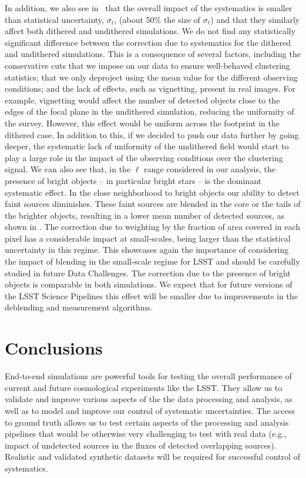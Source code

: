 \documentclass[\docopts]{\docclass}
\begin{document}
In addition, we also see in~ that the overall impact of the systematics is smaller than statistical uncertainty, $\sigma_{\ell}$, (about 50\% the size of $\sigma_{\ell}$) and that they similarly affect both dithered and undithered simulations. We do not find any statistically significant difference between the correction due to systematics for the dithered and undithered simulations. This is a consequence of several factors, including the conservative cuts that we impose on our data to ensure well-behaved clustering statistics; that we only deproject using the mean value for the different observing conditions; and the lack of effects, such as vignetting, present in real images. For example, vignetting would affect the number of detected objects close to the edges of the focal plane in the undithered simulation, reducing the uniformity of the survey. However, this effect would be uniform across the footprint in the dithered case. In addition to this, if we decided to push our data further by going deeper, the systematic lack of uniformity of the undithered field would start to play a large role in the impact of the observing conditions over the clustering signal. We can also see that, in the $\ell$ range considered in our analysis, the presence of bright objects -- in particular bright stars -- is the dominant systematic effect. In the close neighborhood to bright objects our ability to detect faint sources diminishes. These faint sources are blended in the core or the tails of the brighter objects, resulting in a lower mean number of detected sources, as shown in . The correction due to weighting by the fraction of area covered in each pixel has a considerable impact at small-scales, being larger than the statistical uncertainty in this regime. This showcases again the importance of considering the impact of blending in the small-scale regime for LSST and should be carefully studied in future Data Challenges. The correction due to the presence of bright objects is comparable in both simulations. We expect that for future versions of the LSST Science Pipelines this effect will be smaller due to improvements in the deblending and measurement algorithms.


\section{Conclusions}
\label{sec:conclusions}

End-to-end simulations are powerful tools for testing the overall performance of current and future cosmological experiments like the LSST. They allow us to validate and improve various aspects of the the data processing and analysis, as well as to model and improve our control of systematic uncertainties. The access to ground truth allows us to test certain aspects of the processing and analysis pipelines that would be otherwise very challenging to test with real data (e.g., impact of undetected sources in the fluxes of detected overlapping sources). Realistic and validated synthetic datasets will be required for successful control of systematics.
\end{document}

